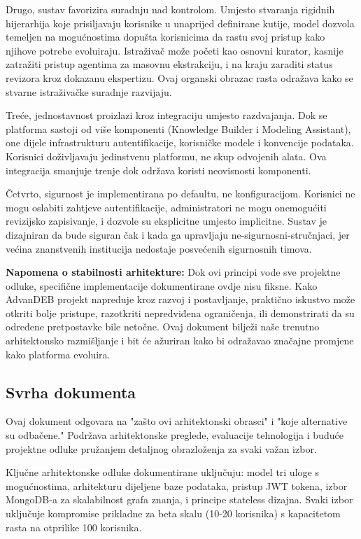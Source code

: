 \documentclass[12pt,a4paper]{article}
\begin{document}
Drugo, sustav favorizira suradnju nad kontrolom. Umjesto stvaranja rigidnih hijerarhija koje prisiljavaju korisnike u unaprijed definirane kutije, model dozvola temeljen na mogućnostima dopušta korisnicima da rastu svoj pristup kako njihove potrebe evoluiraju. Istraživač može početi kao osnovni kurator, kasnije zatražiti pristup agentima za masovnu ekstrakciju, i na kraju zaraditi status revizora kroz dokazanu ekspertizu. Ovaj organski obrazac rasta odražava kako se stvarne istraživačke suradnje razvijaju.

Treće, jednostavnost proizlazi kroz integraciju umjesto razdvajanja. Dok se platforma sastoji od više komponenti (Knowledge Builder i Modeling Assistant), one dijele infrastrukturu autentifikacije, korisničke modele i konvencije podataka. Korisnici doživljavaju jedinstvenu platformu, ne skup odvojenih alata. Ova integracija smanjuje trenje dok održava koristi neovisnosti komponenti.

Četvrto, sigurnost je implementirana po defaultu, ne konfiguracijom. Korisnici ne mogu oslabiti zahtjeve autentifikacije, administratori ne mogu onemogućiti revizijsko zapisivanje, i dozvole su eksplicitne umjesto implicitne. Sustav je dizajniran da bude siguran čak i kada ga upravljaju ne-sigurnosni-stručnjaci, jer većina znanstvenih institucija nedostaje posvećenih sigurnosnih timova.

\textbf{Napomena o stabilnosti arhitekture:} Dok ovi principi vode sve projektne odluke, specifične implementacije dokumentirane ovdje nisu fiksne. Kako AdvanDEB projekt napreduje kroz razvoj i postavljanje, praktično iskustvo može otkriti bolje pristupe, razotkriti nepredviđena ograničenja, ili demonstrirati da su određene pretpostavke bile netočne. Ovaj dokument bilježi naše trenutno arhitektonsko razmišljanje i bit će ažuriran kako bi odražavao značajne promjene kako platforma evoluira.

\subsection{Svrha dokumenta}

Ovaj dokument odgovara na "zašto ovi arhitektonski obrasci" i "koje alternative su odbačene." Podržava arhitektonske preglede, evaluacije tehnologija i buduće projektne odluke pružanjem detaljnog obrazloženja za svaki važan izbor.

Ključne arhitektonske odluke dokumentirane uključuju: model tri uloge s mogućnostima, arhitekturu dijeljene baze podataka, pristup JWT tokena, izbor MongoDB-a za skalabilnost grafa znanja, i principe stateless dizajna. Svaki izbor uključuje kompromise prikladne za beta skalu (10-20 korisnika) s kapacitetom rasta na otprilike 100 korisnika.
\end{document}
